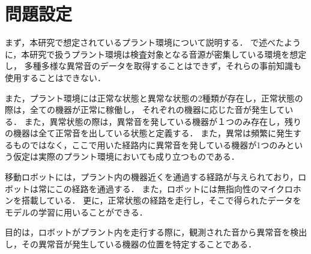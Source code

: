 \documentclass[../main]{subfiles}
\begin{document}
\section{問題設定}
\label{sec:problem_setting}
まず，本研究で想定されているプラント環境について説明する．
で述べたように，本研究で扱うプラント環境は検査対象となる音源が密集している環境を想定し，
多種多様な異常音のデータを取得することはできず，それらの事前知識も使用することはできない．

また，プラント環境には正常な状態と異常な状態の2種類が存在し，正常状態の際は，全ての機器が正常に稼働し，
それぞれの機器に応じた音が発生している．
また，異常状態の際は，異常音を発している機器が１つのみ存在し，残りの機器は全て正常音を出している状態と定義する．
また，異常は頻繁に発生するものではなく，ここで用いた経路内に異常音を発している機器が1つのみという仮定は実際のプラント環境においても成り立つものである．

移動ロボットには，プラント内の機器近くを通過する経路が与えられており，ロボットは常にこの経路を通過する．
また，ロボットには無指向性のマイクロホンを搭載している．
更に，正常状態の経路を走行し，そこで得られたデータをモデルの学習に用いることができる．

目的は，ロボットがプラント内を走行する際に，観測された音から異常音を検出し，その異常音が発生している機器の位置を特定することである．
\end{document}
